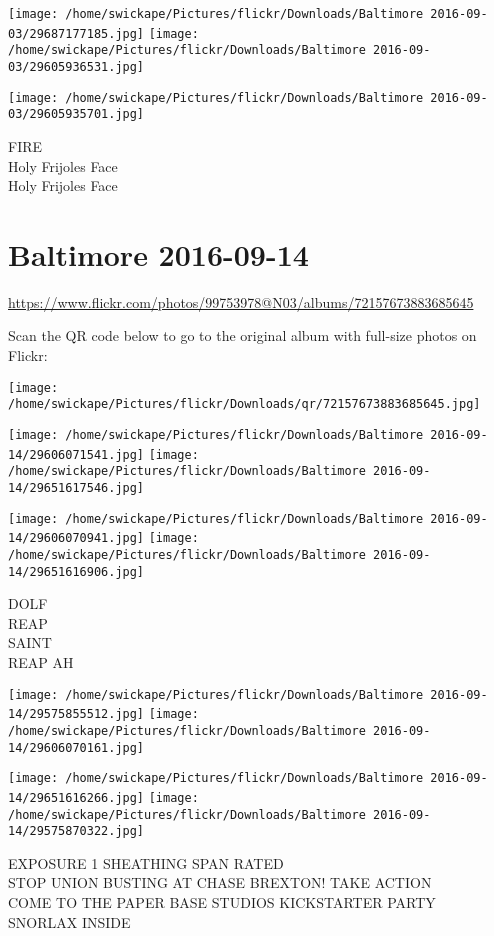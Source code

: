 \documentclass[10pt,letterpaper]{article}
\begin{document}
\texttt{[image: /home/swickape/Pictures/flickr/Downloads/Baltimore 2016-09-03/29687177185.jpg]}
\texttt{[image: /home/swickape/Pictures/flickr/Downloads/Baltimore 2016-09-03/29605936531.jpg]}

\texttt{[image: /home/swickape/Pictures/flickr/Downloads/Baltimore 2016-09-03/29605935701.jpg]}

FIRE\\
Holy Frijoles Face\\
Holy Frijoles Face
\pagebreak

\section*{Baltimore 2016-09-14}

\url{https://www.flickr.com/photos/99753978@N03/albums/72157673883685645}

Scan the QR code below to go to the original album with full-size photos on Flickr:

\texttt{[image: /home/swickape/Pictures/flickr/Downloads/qr/72157673883685645.jpg]}
\pagebreak

\texttt{[image: /home/swickape/Pictures/flickr/Downloads/Baltimore 2016-09-14/29606071541.jpg]}
\texttt{[image: /home/swickape/Pictures/flickr/Downloads/Baltimore 2016-09-14/29651617546.jpg]}

\texttt{[image: /home/swickape/Pictures/flickr/Downloads/Baltimore 2016-09-14/29606070941.jpg]}
\texttt{[image: /home/swickape/Pictures/flickr/Downloads/Baltimore 2016-09-14/29651616906.jpg]}

DOLF\\
REAP\\
SAINT\\
REAP AH
\pagebreak

\texttt{[image: /home/swickape/Pictures/flickr/Downloads/Baltimore 2016-09-14/29575855512.jpg]}
\texttt{[image: /home/swickape/Pictures/flickr/Downloads/Baltimore 2016-09-14/29606070161.jpg]}

\texttt{[image: /home/swickape/Pictures/flickr/Downloads/Baltimore 2016-09-14/29651616266.jpg]}
\texttt{[image: /home/swickape/Pictures/flickr/Downloads/Baltimore 2016-09-14/29575870322.jpg]}

EXPOSURE 1 SHEATHING SPAN RATED\\
STOP UNION BUSTING AT CHASE BREXTON!   TAKE ACTION\\
COME TO THE PAPER BASE STUDIOS KICKSTARTER PARTY\\
SNORLAX INSIDE
\pagebreak
\end{document}

